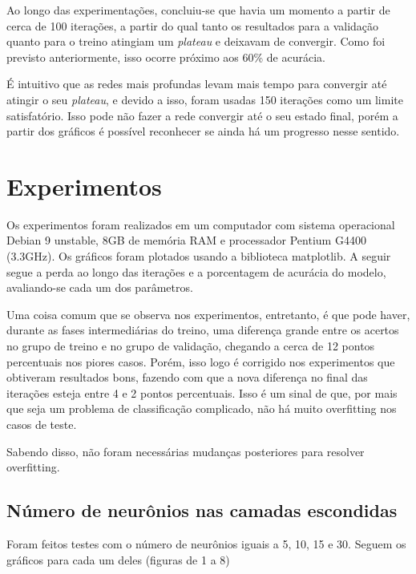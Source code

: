 \documentclass[11pt]{article}
\begin{document}
Ao longo das experimentações, concluiu-se que havia um momento a partir de cerca de 100 iterações, a partir do qual tanto os resultados para a validação quanto para o treino atingiam um \textit{plateau} e deixavam de convergir. Como foi previsto anteriormente, isso ocorre próximo aos 60\% de acurácia.

É intuitivo que as redes mais profundas levam mais tempo para convergir até atingir o seu \textit{plateau}, e devido a isso, foram usadas 150 iterações como um limite satisfatório. Isso pode não fazer a rede convergir até o seu estado final, porém a partir dos gráficos é possível reconhecer se ainda há um progresso nesse sentido.

\section{Experimentos}

Os experimentos foram realizados em um computador com sistema operacional Debian 9 unstable, 8GB de memória RAM e processador Pentium G4400 (3.3GHz). Os gráficos foram plotados usando a biblioteca matplotlib. A seguir segue a perda ao longo das iterações e a porcentagem de acurácia do modelo, avaliando-se cada um dos parâmetros.

Uma coisa comum que se observa nos experimentos, entretanto, é que pode haver, durante as fases intermediárias do treino, uma diferença grande entre os acertos no grupo de treino e no grupo de validação, chegando a cerca de 12 pontos percentuais nos piores casos. Porém, isso logo é corrigido nos experimentos que obtiveram resultados bons, fazendo com que a nova diferença no final das iterações esteja entre 4 e 2 pontos percentuais. Isso é um sinal de que, por mais que seja um problema de classificação complicado, não há muito overfitting nos casos de teste.

Sabendo disso, não foram necessárias mudanças posteriores para resolver overfitting.

\subsection*{Número de neurônios nas camadas escondidas}

Foram feitos testes com o número de neurônios iguais a 5, 10, 15 e 30. Seguem os gráficos para cada um deles (figuras de 1 a 8)
\end{document}
